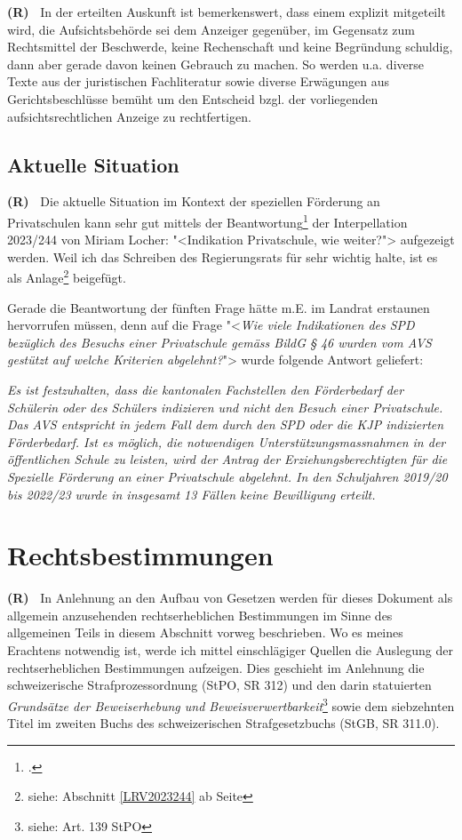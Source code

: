 \documentclass[paper=a4,fontsize=12pt, oneside, numbers=noenddot]{scrbook}
\newcounter{rz}
\newcommand{\Rz}{
	\addtocounter{rz}{1}\textbf{(R\arabic{rz})~}
}
\newcommand{\footnoteExt}[1]{\footnote{siehe: Abschnitt \ref{#1} ab Seite \pageref{#1}}}
\begin{document}
\Rz In der erteilten Auskunft ist bemerkenswert, dass einem  explizit mitgeteilt wird, die Aufsichtsbehörde sei dem Anzeiger gegenüber, im Gegensatz zum Rechtsmittel der Beschwerde, keine Rechenschaft und keine Begründung schuldig, dann aber gerade davon keinen Gebrauch zu machen. So werden u.a. diverse Texte aus der juristischen Fachliteratur sowie diverse Erwägungen aus Gerichtsbeschlüsse bemüht um den Entscheid bzgl. der vorliegenden aufsichtsrechtlichen Anzeige zu rechtfertigen.

\section{Aktuelle Situation}
\Rz Die aktuelle Situation im Kontext der speziellen Förderung an Privatschulen kann sehr gut mittels der Beantwortung\footcite{LRV2023_244} der Interpellation 2023/244 von Miriam Locher: "<Indikation Privatschule, wie weiter?"> aufgezeigt werden. Weil ich das Schreiben des Regierungsrats für sehr wichtig halte, ist es als Anlage\footnoteExt{LRV2023244} beigefügt.


Gerade die Beantwortung der fünften Frage hätte m.E. im Landrat erstaunen hervorrufen müssen, denn auf die Frage "<\textit{Wie viele Indikationen des SPD bezüglich des Besuchs einer Privatschule gemäss BildG § 46 wurden vom AVS gestützt auf welche Kriterien abgelehnt?}"> wurde folgende Antwort geliefert:
\begin{addmargin}[2.5em]{0em}\emph{Es ist festzuhalten, dass die kantonalen Fachstellen den Förderbedarf der Schülerin oder des Schülers indizieren und nicht den Besuch einer Privatschule. Das AVS entspricht in jedem Fall dem durch den SPD oder die KJP indizierten Förderbedarf. Ist es möglich, die notwendigen Unterstützungsmassnahmen in der öffentlichen Schule zu leisten, wird der Antrag der Erziehungsberechtigten für die Spezielle Förderung an einer Privatschule abgelehnt. In den Schuljahren 2019/20 bis 2022/23 wurde in insgesamt 13 Fällen keine Bewilligung erteilt.}
\end{addmargin}



\chapter{Rechtsbestimmungen}
\Rz In Anlehnung an den Aufbau von Gesetzen werden für dieses Dokument als allgemein anzusehenden rechtserheblichen Bestimmungen im Sinne des allgemeinen Teils in diesem Abschnitt vorweg beschrieben. Wo es meines Erachtens notwendig ist, werde ich mittel einschlägiger Quellen die Auslegung der rechtserheblichen Bestimmungen aufzeigen. Dies geschieht im Anlehnung die schweizerische Strafprozessordnung (StPO, SR 312) und den darin statuierten \textit{Grundsätze der Beweiserhebung und Beweisverwertbarkeit}\footnote{siehe: Art. 139 StPO} sowie dem siebzehnten Titel im zweiten Buchs des schweizerischen Strafgesetzbuchs (StGB, SR 311.0).
\end{document}
